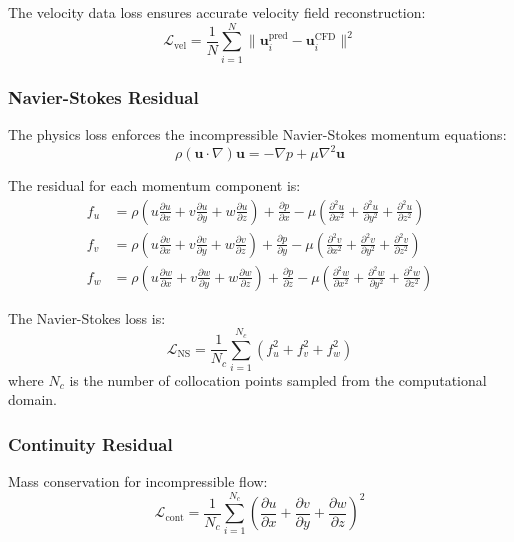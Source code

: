 \documentclass[12pt,a4paper]{article}
\begin{document}
The velocity data loss ensures accurate velocity field reconstruction:
\begin{equation}
    \mathcal{L}_{\text{vel}} = \frac{1}{N} \sum_{i=1}^{N} \|\mathbf{u}_i^{\text{pred}} - \mathbf{u}_i^{\text{CFD}}\|^2
\end{equation}

\subsubsection{Navier-Stokes Residual}
The physics loss enforces the incompressible Navier-Stokes momentum equations:
\begin{equation}
    \rho(\mathbf{u} \cdot \nabla)\mathbf{u} = -\nabla p + \mu \nabla^2 \mathbf{u}
\end{equation}

The residual for each momentum component is:
\begin{align}
    f_u &= \rho\left(u\frac{\partial u}{\partial x} + v\frac{\partial u}{\partial y} + w\frac{\partial u}{\partial z}\right) + \frac{\partial p}{\partial x} - \mu\left(\frac{\partial^2 u}{\partial x^2} + \frac{\partial^2 u}{\partial y^2} + \frac{\partial^2 u}{\partial z^2}\right) \\
    f_v &= \rho\left(u\frac{\partial v}{\partial x} + v\frac{\partial v}{\partial y} + w\frac{\partial v}{\partial z}\right) + \frac{\partial p}{\partial y} - \mu\left(\frac{\partial^2 v}{\partial x^2} + \frac{\partial^2 v}{\partial y^2} + \frac{\partial^2 v}{\partial z^2}\right) \\
    f_w &= \rho\left(u\frac{\partial w}{\partial x} + v\frac{\partial w}{\partial y} + w\frac{\partial w}{\partial z}\right) + \frac{\partial p}{\partial z} - \mu\left(\frac{\partial^2 w}{\partial x^2} + \frac{\partial^2 w}{\partial y^2} + \frac{\partial^2 w}{\partial z^2}\right)
\end{align}

The Navier-Stokes loss is:
\begin{equation}
    \mathcal{L}_{\text{NS}} = \frac{1}{N_c} \sum_{i=1}^{N_c} \left( f_u^2 + f_v^2 + f_w^2 \right)
\end{equation}
where $N_c$ is the number of collocation points sampled from the computational domain.

\subsubsection{Continuity Residual}
Mass conservation for incompressible flow:
\begin{equation}
    \mathcal{L}_{\text{cont}} = \frac{1}{N_c} \sum_{i=1}^{N_c} \left( \frac{\partial u}{\partial x} + \frac{\partial v}{\partial y} + \frac{\partial w}{\partial z} \right)^2
\end{equation}
\end{document}
